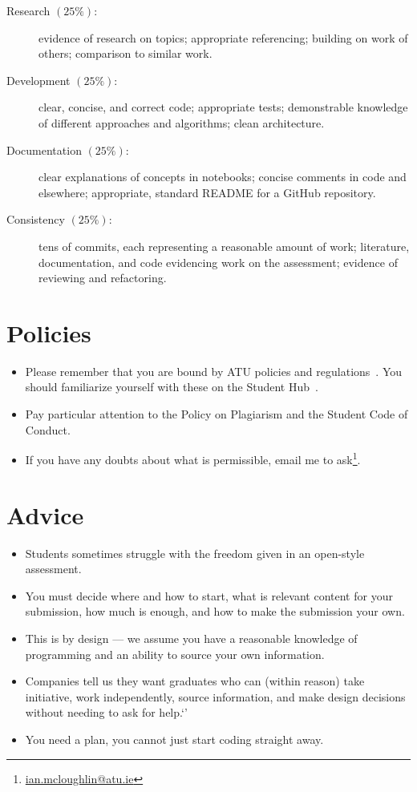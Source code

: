 \documentclass{iansnotes}
\begin{document}
\begin{description}
  \item[Research $(25\%)$:] evidence of research on topics; appropriate referencing; building on work of others; comparison to similar work.
  \item[Development $(25\%)$:] clear, concise, and correct code; appropriate tests; demonstrable knowledge of different approaches and algorithms; clean architecture.
  \item[Documentation $(25\%)$:] clear explanations of concepts in notebooks; concise comments in code and elsewhere; appropriate, standard README for a GitHub repository.
  \item[Consistency $(25\%)$:] tens of commits, each representing a reasonable amount of work; literature, documentation, and code evidencing work on the assessment; evidence of reviewing and refactoring.
\end{description}

\section{Policies}

\begin{itemize}
  \item Please remember that you are bound by ATU policies and regulations~\autocite{atupolicies}. You should familiarize yourself with these on the Student Hub~\autocite{atustudenthub}.
  \item Pay particular attention to the Policy on Plagiarism and the Student Code of Conduct.
  \item If you have any doubts about what is permissible, email me to ask\footnote{\url{ian.mcloughlin@atu.ie}}.
\end{itemize}

\section{Advice}

\begin{itemize}
  \item Students sometimes struggle with the freedom given in an open-style assessment.
  \item You must decide where and how to start, what is relevant content for your submission, how much is enough, and how to make the submission your own.
  \item This is by design --- we assume you have a reasonable knowledge of programming and an ability to source your own information.
  \item Companies tell us they want graduates who can (within reason) take initiative, work independently, source information, and make design decisions without needing to ask for help.`'
  \item You need a plan, you cannot just start coding straight away.
\end{itemize}
\end{document}
